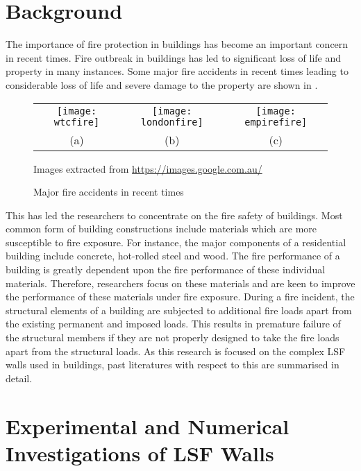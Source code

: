 \section{Background}
The importance of fire protection in buildings has become an important concern in recent times. Fire outbreak in buildings has led to significant loss of life and property in many instances. Some major fire accidents in recent times leading to considerable loss of life and severe damage to the property are shown in . 
\begin{figure}[htbp]
	\centering
		\begin{tabular}{ccc}
			\texttt{[image: wtcfire]} & 
			\texttt{[image: londonfire]} &
			\texttt{[image: empirefire]} \\ 
			(a) & (b) & (c) \\ 
		\end{tabular} 

	\begin{scriptsize}
	Images extracted from \url{https://images.google.com.au/}
	\end{scriptsize}
	
		\caption{Major fire accidents in recent times}
		\label{fig:Major fire accidents}
\end{figure}

This has led the researchers to concentrate on the fire safety of buildings. Most common form of building constructions include materials which are more susceptible to fire exposure. For instance, the major components of a residential building include concrete, hot-rolled steel and wood. The fire performance of a building is greatly dependent upon the fire performance of these individual materials. Therefore, researchers focus on these materials and are keen to improve the performance of these materials under fire exposure. During a fire incident, the structural elements of a building are subjected to additional fire loads apart from the existing permanent and imposed loads. This results in premature failure of the structural members if they are not properly designed to take the fire loads apart from the structural loads. As this research is focused on the complex LSF walls used in buildings, past literatures with respect to this are summarised in detail.

\section{Experimental and Numerical Investigations of LSF Walls}

